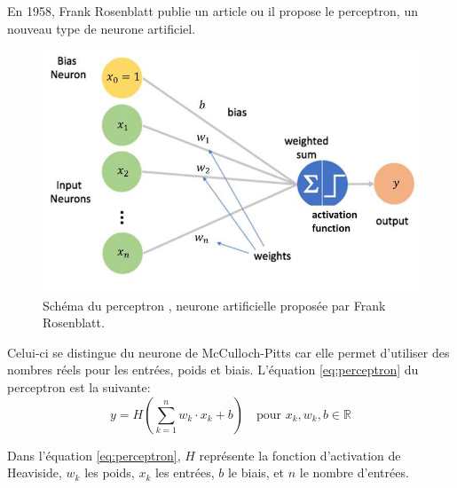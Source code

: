 \par{En 1958, Frank Rosenblatt \cite{rosenblatt_perceptron_1958} publie un article ou il propose le perceptron, un nouveau type
de neurone artificiel.}
\begin{figure}[H]
    \centering
    \includegraphics[width=1\linewidth]{03-tail//A1_fondamentaux_ML//A1_figures//A1_04_perceptron.png}
    \caption{Schéma du perceptron \cite{zahn_cours_2024}, neurone artificielle proposée par Frank Rosenblatt.}
    \label{fig:enter-label}
\end{figure}

\par{Celui-ci se distingue du neurone de McCulloch-Pitts car elle permet d'utiliser des nombres réels pour les entrées, poids et biais. L'équation \ref{eq:perceptron} \cite{rosenblatt_perceptron_1958} du perceptron est la suivante:}
\vspace{20pt}
\begin{equation}
    y = H\left(\sum_{k=1}^{n} w_k \cdot x_k + b\right) \quad \text{pour } x_k, w_k, b \in \mathbb{R}
    \label{eq:perceptron}
\end{equation}
\par{Dans l'équation \ref{eq:perceptron}, $H$ représente la fonction d'activation de Heaviside, $w_k$ les poids, $x_k$ les entrées, $b$ le biais, et $n$ le nombre d'entrées.}

